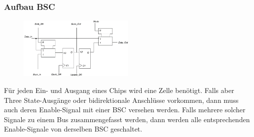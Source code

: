 \subsubsection{Aufbau BSC}
\begin{multicols}{2}
\begin{figure}[H]
    \includegraphics[width=0.5\textwidth]{images/bst_bsc.png}
\end{figure}
Für jeden Ein- und Ausgang eines Chips wird eine Zelle benötigt. Falls aber Three State-Ausgänge oder bidirektionale Anschlüsse vorkommen, dann muss auch deren Enable-Signal mit einer BSC versehen werden. Falls mehrere solcher Signale zu einem Bus zusammengefasst werden, dann werden alle entsprechenden Enable-Signale von derselben BSC geschaltet.
\end{multicols}
